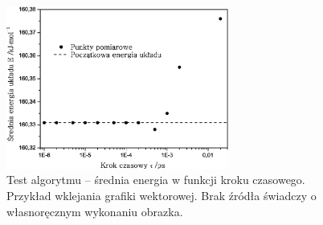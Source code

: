 \begin{figure}[H]
	\centering
	\includegraphics[width=0.65\textwidth]{krok_czasowy}
    \captionsetup{justification=justified}
    \caption{Test algorytmu -- średnia energia w funkcji kroku czasowego. Przykład wklejania grafiki wektorowej. Brak źródła świadczy o własnoręcznym wykonaniu obrazka.}
    \label{rys2}
\end{figure}

